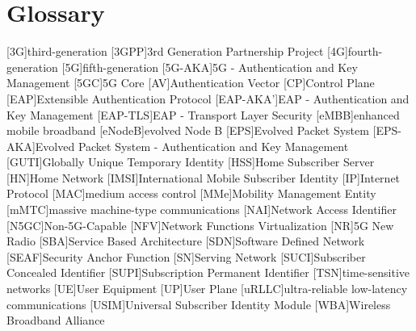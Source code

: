 \chapter{Glossary}

\footnotesize
\SingleSpacing

\begin{multicols}{2}
\begin{acronym}[AAAAAA]
[3G]{third-generation}
[3GPP]{3rd Generation Partnership Project}
[4G]{fourth-generation}
[5G]{fifth-generation}
[5G-AKA]{5G - Authentication and Key Management}
[5GC]{5G Core}
[AV]{Authentication Vector}
[CP]{Control Plane}
[EAP]{Extensible Authentication Protocol}
[EAP-AKA']{EAP - Authentication and Key Management}
[EAP-TLS]{EAP - Transport Layer Security}
[eMBB]{enhanced mobile broadband}
[eNodeB]{evolved Node B}
[EPS]{Evolved Packet System}
[EPS-AKA]{Evolved Packet System - Authentication and Key Management}
[GUTI]{Globally Unique Temporary Identity}
[HSS]{Home Subscriber Server}
[HN]{Home Network}
[IMSI]{International Mobile Subscriber Identity}
[IP]{Internet Protocol}
[MAC]{medium access control}
[MMe]{Mobility Management Entity}
[mMTC]{massive machine-type communications}
[NAI]{Network Access Identifier}
[N5GC]{Non-5G-Capable}
[NFV]{Network Functions Virtualization}
[NR]{5G New Radio}
[SBA]{Service Based Architecture}
[SDN]{Software Defined Network}
[SEAF]{Security Anchor Function}
[SN]{Serving Network}
[SUCI]{Subscriber Concealed Identifier}
[SUPI]{Subscription Permanent Identifier}
[TSN]{time-sensitive networks}
[UE]{User Equipment}
[UP]{User Plane}
[uRLLC]{ultra-reliable low-latency communications}
[USIM]{Universal Subscriber Identity Module}
[WBA]{Wireless Broadband Alliance}
\end{acronym}
\end{multicols}

